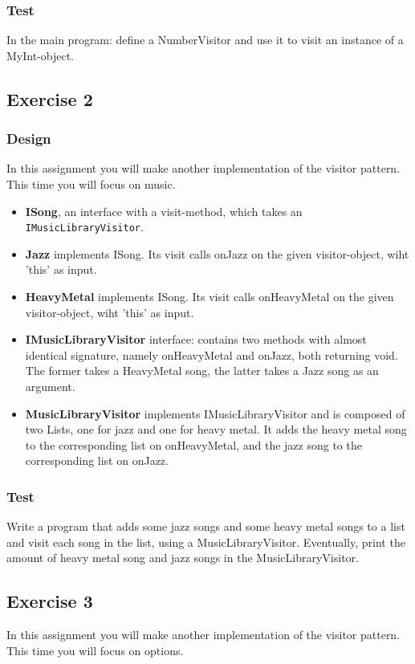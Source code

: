 \subsubsection{Test}
In the main program: define a NumberVisitor and use it to visit an instance of a MyInt-object.

\subsection{Exercise 2}
\subsubsection{Design}
In this assignment you will make another implementation of the visitor pattern.
This time you will focus on music.
\begin{itemize}
\item \textbf{ISong}, an interface with a visit-method, which takes an \texttt{IMusicLibraryVisitor}.
\item \textbf{Jazz} implements ISong. Its visit calls onJazz on the given visitor-object, wiht 'this' as input.
\item \textbf{HeavyMetal} implements ISong. Its visit calls onHeavyMetal on the given visitor-object, wiht 'this' as input.
\item \textbf{IMusicLibraryVisitor} interface: contains two methods with almost identical signature, namely onHeavyMetal and onJazz, both returning void. The former takes a HeavyMetal song, the latter takes a Jazz song as an argument.
\item \textbf{MusicLibraryVisitor} implements IMusicLibraryVisitor and is composed of two Lists, one for jazz and one for heavy metal. It adds the heavy metal song to the corresponding list on onHeavyMetal, and the jazz song to the corresponding list on onJazz.
\end{itemize}
\subsubsection{Test}
Write a program that adds some jazz songs and some heavy metal songs to a list and visit each song in the list, using a MusicLibraryVisitor.
Eventually, print the amount of heavy metal song and jazz songs in the MusicLibraryVisitor.

\subsection{Exercise 3}
In this assignment you will make another implementation of the visitor pattern.
This time you will focus on options.

